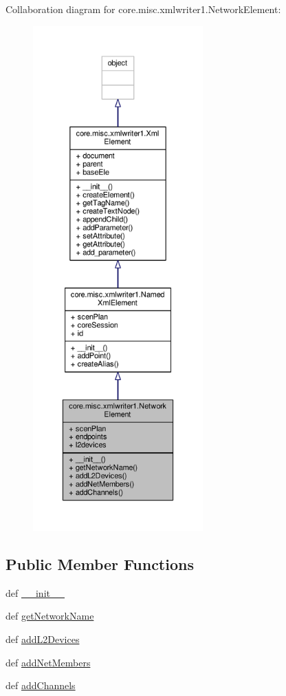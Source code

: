 Collaboration diagram for core.\+misc.\+xmlwriter1.\+Network\+Element\+:
\nopagebreak
\begin{figure}[H]
\begin{center}
\leavevmode
\includegraphics[height=550pt]{classcore_1_1misc_1_1xmlwriter1_1_1_network_element__coll__graph}
\end{center}
\end{figure}
\subsection*{Public Member Functions}
\begin{DoxyCompactItemize}
\item 
def \hyperlink{classcore_1_1misc_1_1xmlwriter1_1_1_network_element_aa1cb831ce6d34738bdaf1057904e4d20}{\+\_\+\+\_\+init\+\_\+\+\_\+}
\item 
def \hyperlink{classcore_1_1misc_1_1xmlwriter1_1_1_network_element_ab2dddae8d6cabed4c674cd4069e1bf46}{get\+Network\+Name}
\item 
def \hyperlink{classcore_1_1misc_1_1xmlwriter1_1_1_network_element_a1079f2268d87932be3eb3bccc15d328b}{add\+L2\+Devices}
\item 
def \hyperlink{classcore_1_1misc_1_1xmlwriter1_1_1_network_element_aaaa28bf5507471efc1ad415a403c011f}{add\+Net\+Members}
\item 
def \hyperlink{classcore_1_1misc_1_1xmlwriter1_1_1_network_element_a33d180fc41d089f474975c42f2927546}{add\+Channels}
\end{DoxyCompactItemize}

